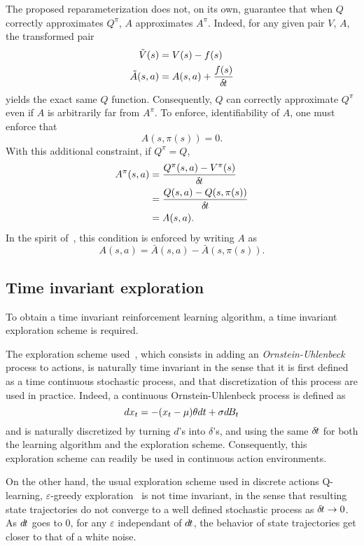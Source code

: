 The proposed reparameterization does not, on its own, guarantee that
when $Q$ correctly approximates $Q^\pi$, $A$ approximates $A^\pi$.  Indeed, for
any given pair $V$, $A$, the transformed pair
\begin{align}
	\tilde{V}(s) &= V(s) - f(s)\\
	\tilde{A}(s, a) &= A(s, a) + \frac{f(s)}{{\delta\hspace{-.1em}t}}
\end{align}
yields the exact same $Q$ function. Consequently, $Q$ can correctly approximate
$Q^\pi$ even if $A$ is arbitrarily far from $A^\pi$.
To enforce, identifiability of $A$, one must enforce that 
\begin{equation}
	A(s, \pi(s)) = 0.
\end{equation}
With this additional constraint, if $Q^\pi = Q$,
\begin{align}
	A^\pi(s, a) &= \frac{Q^\pi(s,a) - V^\pi(s)}{{\delta\hspace{-.1em}t}}\\
		    &= \frac{Q(s,a) - Q(s, \pi(s))}{{\delta\hspace{-.1em}t}}\\
		    &= A(s, a).
\end{align}
In the spirit of~\cite{dueling_nets}, this condition is enforced by writing $A$ as
\begin{equation}
	A(s, a) = \bar{A}(s, a) - \bar{A}(s, \pi(s)).
\end{equation}

\subsection{Time invariant exploration}
\label{subsec:explo}
To obtain a time invariant reinforcement learning algorithm, a time invariant
exploration scheme is required. 

The exploration scheme used~\cite{ddpg}, which consists in adding an
\emph{Ornstein-Uhlenbeck}~\cite{orn-uhl} process to actions, is naturally time
invariant in the sense that it is first defined as a time continuous stochastic
process, and that discretization of this process are used in practice. Indeed,
a continuous Ornstein-Uhlenbeck process is defined as
\begin{equation}
	dx_t = - (x_t - \mu) \theta dt + \sigma d\hspace{-.1em}B_t
	\label{eq:orn_uhl}
\end{equation}
and is naturally discretized by turning $d$'s into $\delta$'s, and using
the same ${\delta\hspace{-.1em}t}$ for both the learning algorithm and the exploration scheme.
Consequently, this exploration scheme can readily be used in continuous action
environments.

On the other hand, the usual exploration scheme used in discrete actions
Q-learning, $\varepsilon$-greedy exploration~\cite{sutton} is not time
invariant, in the sense that resulting state trajectories do not converge to a
well defined stochastic process as ${\delta\hspace{-.1em}t} \rightarrow 0$. As $d\hspace{-.1em}t$ goes to $0$,
for any $\varepsilon$ independant of $d\hspace{-.1em}t$, the behavior of state trajectories get
closer to that of a white noise.

